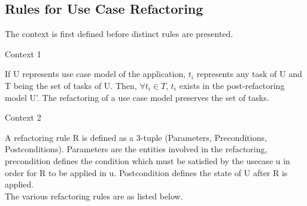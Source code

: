 \subsection{Rules for Use Case Refactoring}\label{section:selection_by_use_case/rules_for_use_case_refactoring}
The context is first defined before distinct rules are presented.
\\
\begin{shaded}Context 1 \end{shaded}
If U represents use case model of the application, $t_i$ represents any task of U and T being the set of tasks of U. Then, $\forall t_i \in T $, $t_i$ exists in the post-refactoring model U'. The refactoring of a use case model preserves the set of tasks.
\\
\begin{shaded}Context 2 \end{shaded}
A refactoring rule R is defined as a 3-tuple (Parameters, Preconditions, Postconditions). Parameters are the entities involved in the refactoring, precondition defines the condition which must be satisfied by the usecase u in order for R to be applied in u. Postcondition defines the state of U after R is applied.
\\
The various refactoring rules are as listed below.
\\
